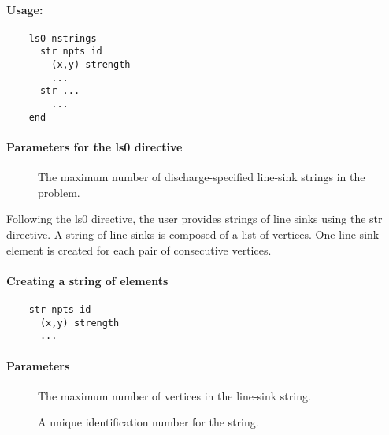 \paragraph{Usage:}
\begin{verbatim}
    ls0 nstrings
      str npts id
        (x,y) strength 
        ...
      str ...
        ...
    end
\end{verbatim}

\paragraph{Parameters for the \textsf{ls0} directive}
\begin{description}
  \item [] The maximum number of discharge-specified
        line-sink strings in the problem. \units{-}
\end{description}
Following the \textsf{ls0} directive, the user provides strings of line sinks using the \textsf{str} directive. A string of line sinks is composed of a list of vertices. One 
line sink element is created for each pair of consecutive vertices.

\paragraph{Creating a string of elements}
\begin{verbatim}
    str npts id
      (x,y) strength
      ...
\end{verbatim}

\paragraph{Parameters}
\begin{description}
\item [] The maximum number of vertices in the line-sink
      string. \units{-}
\item [] A unique identification number for the string. \units{-}
\end{description}

